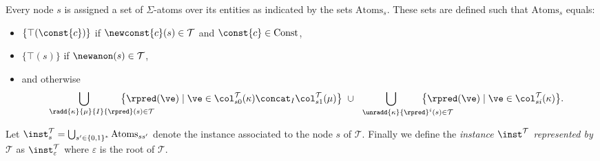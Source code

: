 \begin{definition}
%
Every node $s$ is assigned a set of $\Sigma$-atoms over its entities as indicated by the sets $\mathrm{Atoms}_s$. These sets are defined such that $\mathrm{Atoms}_s$ equals:
\begin{itemize}
	\item \!$\{ \top(\const{c}) \}$ if $\newconst{c}(s)\in\mathcal{T}$ and $\const{c}\in\mathrm{Const}$,
	\item \!$\{ \top(s) \}$ if $\newanon(s)\in\mathcal{T}$,
	\item and otherwise
		\begin{align*}
			 \hspace{-10ex}\bigcup_{\hspace{8.5ex}\radd{\kappa}{\mu}{I}{\rpred}(s)\in\mathcal{T}} \hspace{-8.5ex}\big\{  \rpred(\ve) \mid  \ve  \in \col_{s0}^{\mathcal{T}}(\kappa)\concat_{I}\col_{s1}^{\mathcal{T}}(\mu) \big\} \ 
			 \cup 
			  \hspace{-6.5ex}\bigcup_{\hspace{8ex}\unradd{\kappa}{\rpred}^i(s)\in\mathcal{T}}\hspace{-8ex} \big\{ \rpred(\ve) \mid  \ve\in\col_{si}^{\mathcal{T}}(\kappa) \big\}.
		\end{align*}
\end{itemize}
%
Let 
$\inst^{\mathcal{T}}_s = \bigcup_{s'\in\{ 0,1 \}^*}\mathrm{Atoms}_{ss'}$ denote the instance associated to the node $s$ of $\mathcal{T}$. Finally we define the \emph{instance $\inst^{\mathcal{T}}$ represented by $\mathcal{T}$} as $\inst^{\mathcal{T}}_{\varepsilon}$ where $\varepsilon$ is the root of $\mathcal{T}$.
\end{definition}

